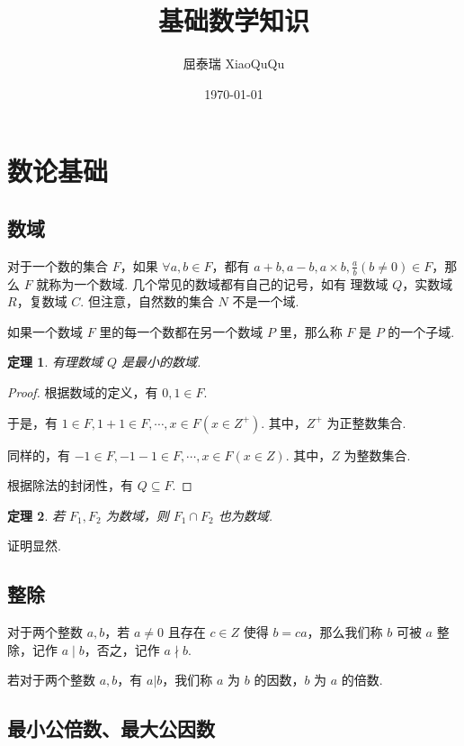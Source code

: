 \documentclass[a4paper]{article}
\title{基础数学知识}
\author{屈泰瑞 XiaoQuQu}
\date{\today}
\newtheorem{theorem}{定理}[section]
\begin{document}
\maketitle

\newpage

\section{数论基础}

\subsection{数域}

对于一个数的集合 $F$，如果 $\forall a,b\in F$，都有 $a+b,a-b,a\times b,\frac
    {a}{b}(b\ne 0) \in F$，那么 $F$ 就称为一个数域. 几个常见的数域都有自己的记号，如有
理数域 $Q$，实数域 $R$，复数域 $C$. 但注意，自然数的集合 $N$ 不是一个域.

如果一个数域 $F$ 里的每一个数都在另一个数域 $P$ 里，那么称 $F$ 是 $P$ 的一个子域.

\begin{theorem}
    有理数域 $Q$ 是最小的数域.
\end{theorem}

\begin{proof}
    根据数域的定义，有 $0,1\in F$.

    于是，有 $1\in F, 1+1\in F,\cdots, x\in F(x\in Z^+)$. 其中，$Z^+$ 为正整数集合.

    同样的，有 $-1\in F,-1-1\in F,\cdots, x\in F(x\in Z)$. 其中，$Z$ 为整数集合.

    根据除法的封闭性，有 $Q\subseteq F$.
\end{proof}

\begin{theorem}
    若 $F_1,F_2$ 为数域，则 $F_1 \cap F_2$ 也为数域.
\end{theorem}

证明显然.

\subsection{整除}

对于两个整数 $a,b$，若 $a\ne 0$ 且存在 $c \in Z$ 使得 $b=ca$，那么我们称 $b$ 可被
$a$ 整除，记作 $a\mathrel{|}b$，否之，记作 $a \nmid b$.

若对于两个整数 $a,b$，有 $a|b$，我们称 $a$ 为 $b$ 的因数，$b$ 为 $a$ 的倍数.

\subsection{最小公倍数、最大公因数}
\end{document}
